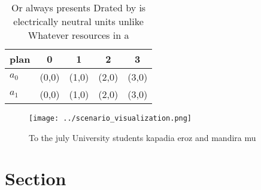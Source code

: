 \documentclass[a4paper]{article}
\begin{document}
\begin{table}
\begin{adjustbox}{width=0.6\columnwidth}
\begin{tabular}{|l|l|l|l|l|}
\hline
\textbf{plan} & \multicolumn{1}{c|}{\textbf{0}} & \multicolumn{1}{c|}{\textbf{1}} & \multicolumn{1}{c|}{\textbf{2}} & \multicolumn{1}{c|}{\textbf{3}} \\ \hline
\textbf{$a_0$}  & (0,0) & (1,0) & (2,0) & (3,0) \\ \hline
\textbf{$a_1$}  & (0,0) & (1,0) & (2,0) & (3,0) \\ \hline
\end{tabular}
\end{adjustbox}
\caption{Or always presents Drated by is electrically neutral units unlike Whatever resources in a
}
\end{table}

\begin{figure}
\centering
\texttt{[image: ../scenario\_visualization.png]}
\caption{To the july University students kapadia eroz and mandira mu
}
\end{figure}
 
\section{Section}
\end{document}
